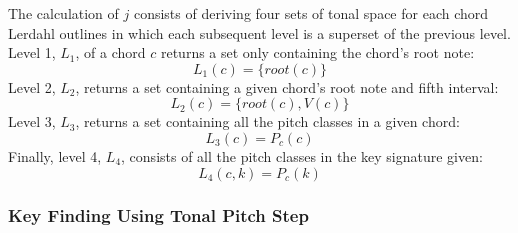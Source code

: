 The calculation of $j$ consists of deriving four sets of tonal space for each chord Lerdahl outlines in which each subsequent level is a superset of the previous level. Level 1, $L_1$, of a chord $c$ returns a set only containing the chord's root note: \[L_1(c) = \{root(c)\}\] Level 2, $L_2$, returns a set containing a given chord's root note and fifth interval: \[L_2(c) = \{root(c), V(c)\}\] Level 3, $L_3$, returns a set containing all the pitch classes in a given chord: \[L_3(c) = P_c(c)\] Finally, level 4, $L_4$, consists of all the pitch classes in the key signature given: \[L_4(c,k) = P_c(k)\]

\subsubsection{Key Finding Using Tonal Pitch Step}
